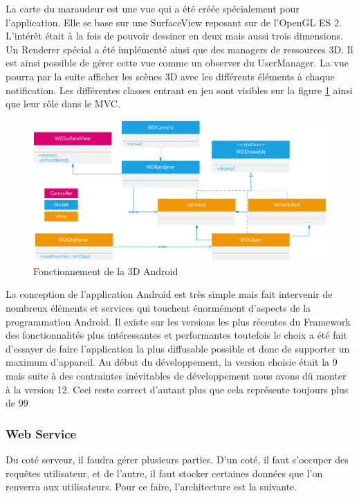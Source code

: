         La carte du maraudeur est une vue qui a été créée spécialement pour l’application. Elle se base sur une SurfaceView reposant sur de l’OpenGL ES 2. L’intérêt était à la fois de pouvoir dessiner en deux mais aussi trois dimensions. Un Renderer spécial a été implémenté ainsi que des managers de ressources 3D. Il est ainsi possible de gérer cette vue comme un observer du UserManager. La vue pourra par la suite afficher les scènes 3D avec les différents éléments à chaque notification. Les différentes classes entrant en jeu sont visibles sur la figure \ref{3d} ainsi que leur rôle dans le MVC.

        \begin{figure}[H]
            \centering
            \includegraphics{./img/android-3d.png}
            \caption{Fonctionnement de la 3D Android}
            \label{3d}
        \end{figure}

        La conception de l’application Android est très simple mais fait intervenir de nombreux éléments et services qui touchent énormément d’aspects de la programmation Android. Il existe sur les versions les plus récentes du Framework des fonctionnalités plus intéressantes et performantes toutefois le choix a été fait d’essayer de faire l’application la plus diffusable possible et donc de supporter un maximum d’appareil. Au début du développement, la version choisie était la 9 mais suite à des contraintes inévitables de développement nous avons dû monter à la version 12. Ceci reste correct d’autant plus que cela représente toujours plus de 99%

        \subsubsection{Web Service}

            Du coté serveur, il faudra gérer plusieurs parties. D'un coté, il faut s'occuper des requêtes utilisateur, et de l'autre, il faut stocker certaines données que l'on renverra aux utilisateurs.
            Pour ce faire, l'architecture est la suivante.

